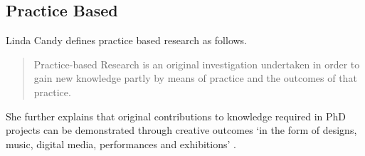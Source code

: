 \documentclass[11pt]{thesis} %
\begin{document}
\begin{draft}

\end{draft}

\subsection{Practice Based}

Linda Candy defines practice based research as follows.

\begin{quotation}
  Practice-based Research is an original investigation undertaken in order to gain new knowledge partly by means of practice and the outcomes of that practice. 
\end{quotation}

She further explains that original contributions to knowledge required in PhD projects can be demonstrated through creative outcomes `in the form of designs, music, digital media, performances and exhibitions' \autocite{Candy2006}.




\end{document}
